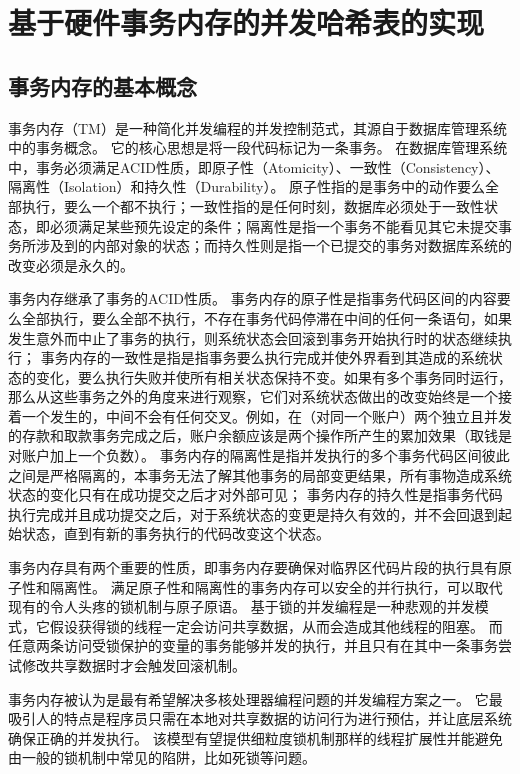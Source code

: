 
\chapter{基于硬件事务内存的并发哈希表的实现}

\section{事务内存的基本概念}
事务内存（TM）是一种简化并发编程的并发控制范式，其源自于数据库管理系统中的事务概念。
它的核心思想是将一段代码标记为一条事务。
在数据库管理系统中，事务必须满足ACID性质，即原子性（Atomicity）、一致性（Consistency）、隔离性（Isolation）和持久性（Durability）。
原子性指的是事务中的动作要么全部执行，要么一个都不执行；一致性指的是任何时刻，数据库必须处于一致性状态，即必须满足某些预先设定的条件；隔离性是指一个事务不能看见其它未提交事务所涉及到的内部对象的状态；而持久性则是指一个已提交的事务对数据库系统的改变必须是永久的。

事务内存继承了事务的ACID性质。
事务内存的原子性是指事务代码区间的内容要么全部执行，要么全部不执行，不存在事务代码停滞在中间的任何一条语句，如果发生意外而中止了事务的执行，则系统状态会回滚到事务开始执行时的状态继续执行；
事务内存的一致性是指是指事务要么执行完成并使外界看到其造成的系统状态的变化，要么执行失败并使所有相关状态保持不变。如果有多个事务同时运行，那么从这些事务之外的角度来进行观察，它们对系统状态做出的改变始终是一个接着一个发生的，中间不会有任何交叉。例如，在（对同一个账户）两个独立且并发的存款和取款事务完成之后，账户余额应该是两个操作所产生的累加效果（取钱是对账户加上一个负数）。
事务内存的隔离性是指并发执行的多个事务代码区间彼此之间是严格隔离的，本事务无法了解其他事务的局部变更结果，所有事物造成系统状态的变化只有在成功提交之后才对外部可见；
事务内存的持久性是指事务代码执行完成并且成功提交之后，对于系统状态的变更是持久有效的，并不会回退到起始状态，直到有新的事务执行的代码改变这个状态。

事务内存具有两个重要的性质，即事务内存要确保对临界区代码片段的执行具有原子性和隔离性。
满足原子性和隔离性的事务内存可以安全的并行执行，可以取代现有的令人头疼的锁机制与原子原语。
基于锁的并发编程是一种悲观的并发模式，它假设获得锁的线程一定会访问共享数据，从而会造成其他线程的阻塞。
而任意两条访问受锁保护的变量的事务能够并发的执行，并且只有在其中一条事务尝试修改共享数据时才会触发回滚机制。

事务内存被认为是最有希望解决多核处理器编程问题的并发编程方案之一。
它最吸引人的特点是程序员只需在本地对共享数据的访问行为进行预估，并让底层系统确保正确的并发执行。
该模型有望提供细粒度锁机制那样的线程扩展性并能避免由一般的锁机制中常见的陷阱，比如死锁等问题。

